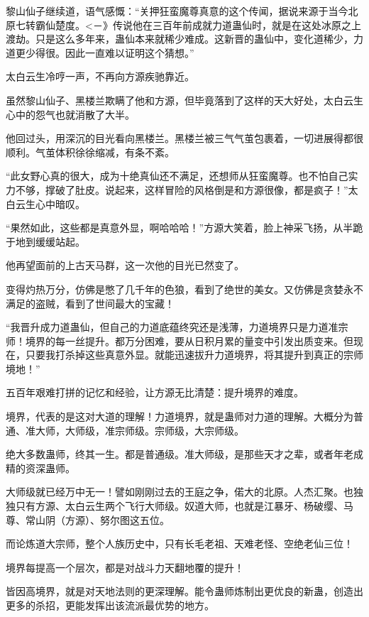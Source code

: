 
\begin{this_body}

黎山仙子继续道，语气感慨：“关押狂蛮魔尊真意的这个传闻，据说来源于当今北原七转霸仙楚度。<－》传说他在三百年前成就力道蛊仙时，就是在这处冰原之上渡劫。只是这么多年来，蛊仙本来就稀少难成。这新晋的蛊仙中，变化道稀少，力道更少得很。因此一直难以证明这个猜想。”

太白云生冷哼一声，不再向方源疾驰靠近。

虽然黎山仙子、黑楼兰欺瞒了他和方源，但毕竟落到了这样的天大好处，太白云生心中的怨气也就消散了大半。

他回过头，用深沉的目光看向黑楼兰。黑楼兰被三气气茧包裹着，一切进展得都很顺利。气茧体积徐徐缩减，有条不紊。

“此女野心真的很大，成为十绝真仙还不满足，还想师从狂蛮魔尊。也不怕自己实力不够，撑破了肚皮。说起来，这样冒险的风格倒是和方源很像，都是疯子！”太白云生心中暗叹。

“果然如此，这些都是真意外显，啊哈哈哈！”方源大笑着，脸上神采飞扬，从半跪于地到缓缓站起。

他再望面前的上古天马群，这一次他的目光已然变了。

变得灼热万分，仿佛是憋了几千年的色狼，看到了绝世的美女。又仿佛是贪婪永不满足的盗贼，看到了世间最大的宝藏！

“我晋升成力道蛊仙，但自己的力道底蕴终究还是浅薄，力道境界只是力道准宗师！境界的每一丝提升。都万分困难，要从日积月累的量变中引发出质变来。但现在，只要我打杀掉这些真意外显。就能迅速拔升力道境界，将其提升到真正的宗师境地！”

五百年艰难打拼的记忆和经验，让方源无比清楚：提升境界的难度。

境界，代表的是这对大道的理解！力道境界，就是蛊师对力道的理解。大概分为普通、准大师，大师级，准宗师级。宗师级，大宗师级。

绝大多数蛊师，终其一生。都是普通级。准大师级，是那些天才之辈，或者年老成精的资深蛊师。

大师级就已经万中无一！譬如刚刚过去的王庭之争，偌大的北原。人杰汇聚。也独独只有方源、太白云生两个飞行大师级。奴道大师，也就是江暴牙、杨破缨、马尊、常山阴（方源）、努尔图这五位。

而论炼道大宗师，整个人族历史中，只有长毛老祖、天难老怪、空绝老仙三位！

境界每提高一个层次，都是对战斗力天翻地覆的提升！

皆因高境界，就是对天地法则的更深理解。能令蛊师炼制出更优良的新蛊，创造出更多的杀招，更能发挥出该流派最优势的地方。


\end{this_body}
